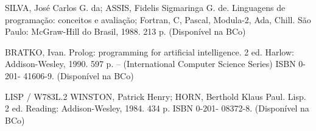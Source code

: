 {{        SILVA, José Carlos G. da; ASSIS, Fidelis Sigmaringa G. de. Linguagens de programação: conceitos e avaliação; Fortran, C, Pascal, Modula-2, Ada, Chill. São Paulo: McGraw-Hill do Brasil, 1988. 213 p. (Disponível na BCo)

        BRATKO, Ivan. Prolog: programming for artificial intelligence. 2 ed. Harlow: Addison-Wesley, 1990. 597 p. -- (International Computer Science Series) ISBN 0-201- 41606-9.  (Disponível na BCo)

        LISP / W783L.2 WINSTON, Patrick Henry; HORN, Berthold Klaus Paul. Lisp. 2 ed. Reading: Addison-Wesley, 1984. 434 p. ISBN 0-201- 08372-8.  (Disponível na BCo)
    }

}